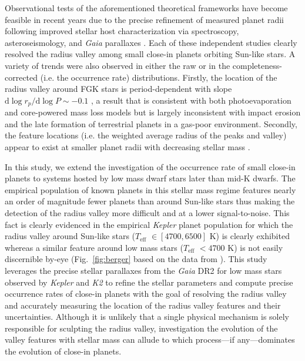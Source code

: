 \documentclass[twocolumn]{emulateapj}
\newcommand{\gaia}[1]{\emph{Gaia}#1}
\newcommand{\kepler}[1]{\emph{Kepler}#1}
\newcommand{\ktwo}[1]{\emph{K2}#1}
\newcommand{\teff}[1]{$T_{\text{eff}}$#1}
\begin{document}
Observational tests of the aforementioned theoretical frameworks have become feasible in recent years due to 
the precise refinement of measured planet radii following improved stellar host characterization via  
spectroscopy, asteroseismology, and \gaia{} parallaxes
\citep[e.g.][]{fulton17,berger18,fulton18,vaneylen18,martinez19}. Each of these independent studies clearly
resolved the radius valley among small close-in planets orbiting Sun-like stars.
A variety of trends were also observed in either
the raw or in the completeness-corrected (i.e. the occurrence rate) distributions. Firstly,
the location of the radius valley around FGK stars is period-dependent with slope
$\mathrm{d}\log{r_p} / \mathrm{d}\log{P} \sim -0.1$ \citep{vaneylen18,martinez19}, a result that is consistent
with both photoevaporation and core-powered mass loss models but is largely inconsistent with impact erosion
and the late formation of
terrestrial planets in a gas-poor environment. Secondly, the feature locations (i.e. the weighted
average radius of the peaks and valley) appear to exist at smaller planet radii with decreasing stellar
mass \citep{fulton18,wu19}.

In this study, we extend the investigation of the occurrence rate of small close-in planets to systems hosted by
low mass dwarf stars later than mid-K dwarfs.
The empirical population of known planets in this stellar mass regime features nearly an order of magnitude
fewer planets than around Sun-like stars thus making the detection of the radius valley more
difficult and at a lower signal-to-noise. This fact is clearly evidenced in the empirical \kepler{} planet population
for which the radius valley around Sun-like stars (\teff{} $\in [4700,6500]$ K) is clearly exhibited whereas a similar
feature around low mass stars (\teff{} $< 4700$ K) is not easily discernible by-eye (Fig.~\ref{fig:berger} based on
the data from \citealt{berger18}). This study leverages the precise stellar parallaxes from the \gaia{} DR2
for low mass stars observed by \kepler{} and \ktwo{} to refine the stellar parameters and compute precise
occurrence rates of close-in planets with the goal of resolving the radius valley and accurately measuring the
location of the radius valley features and their uncertainties. Although it is unlikely that a single physical
mechanism is solely responsible for sculpting the radius valley, investigation the evolution of the valley features
with stellar mass can allude to which process---if any---dominates the evolution of close-in planets.
\end{document}

